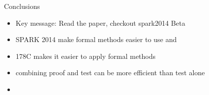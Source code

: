 \documentclass{beamer}
\begin{document}
\begin{frame}[fragile]{Conclusions}
  \begin{itemize}
     \item Key message: Read the paper, checkout spark2014 Beta
     \item SPARK 2014 make formal methods easier to use and 
     \item 178C makes it easier to apply formal methods
     \item combining proof and test can be more efficient than test alone
     \item 
  \end{itemize}
\end{frame}
\end{document}
